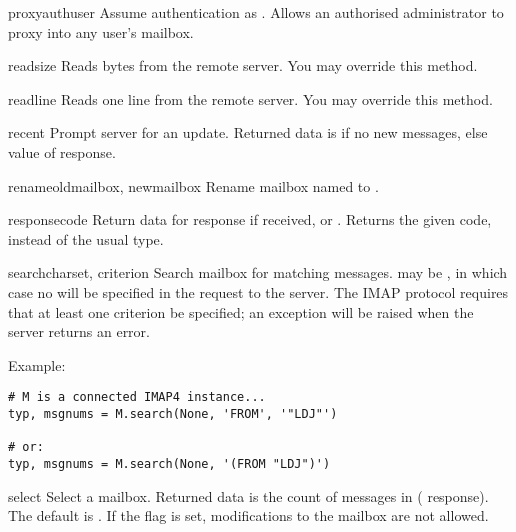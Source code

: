 \begin{methoddesc}{proxyauth}{user}
  Assume authentication as .
  Allows an authorised administrator to proxy into any user's mailbox.
\end{methoddesc}

\begin{methoddesc}{read}{size}
  Reads  bytes from the remote server.
  You may override this method.
\end{methoddesc}

\begin{methoddesc}{readline}{}
  Reads one line from the remote server.
  You may override this method.
\end{methoddesc}

\begin{methoddesc}{recent}{}
  Prompt server for an update. Returned data is  if no new
  messages, else value of  response.
\end{methoddesc}

\begin{methoddesc}{rename}{oldmailbox, newmailbox}
  Rename mailbox named  to .
\end{methoddesc}

\begin{methoddesc}{response}{code}
  Return data for response  if received, or
  . Returns the given code, instead of the usual type.
\end{methoddesc}

\begin{methoddesc}{search}{charset, criterion}
  Search mailbox for matching messages.   may be
  , in which case no  will be specified in the
  request to the server.  The IMAP protocol requires that at least one
  criterion be specified; an exception will be raised when the server
  returns an error.

  Example:

\begin{verbatim}
# M is a connected IMAP4 instance...
typ, msgnums = M.search(None, 'FROM', '"LDJ"')

# or:
typ, msgnums = M.search(None, '(FROM "LDJ")')
\end{verbatim}
\end{methoddesc}

\begin{methoddesc}{select}{}
  Select a mailbox. Returned data is the count of messages in
   ( response).  The default 
  is .  If the  flag is set, modifications
  to the mailbox are not allowed.
\end{methoddesc}


